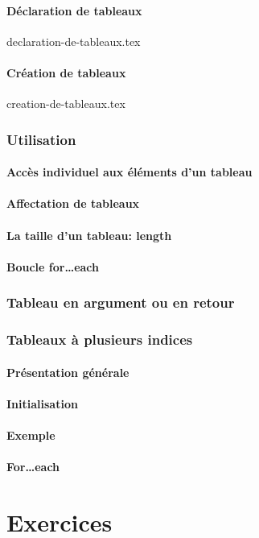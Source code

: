 \documentclass{beamer}
\begin{document}
        \subsection{Déclaration de tableaux}\label{subsec:declaration-de-tableaux}
    {declaration-de-tableaux.tex}
        \subsection{Création de tableaux}\label{subsec:creation-de-tableaux}
    {creation-de-tableaux.tex}

    \section{Utilisation}
        \subsection{Accès individuel aux éléments d'un tableau}\label{subsec:acces-individuel-aux-elements-dun-tableau}
        \subsection{Affectation de tableaux}\label{subsec:affectation-de-tableaux}
        \subsection{La taille d'un tableau: length}\label{subsec:la-taille-dun-tableau}
        \subsection{Boucle for\ldots each}\label{subsec:boucle-foreach}

    \section{Tableau en argument ou en retour}\label{sec:tableau-en-argument-ou-en-retour}

    \section{Tableaux à plusieurs indices}\label{sec:tableaux-a-plusieurs-indices}
        \subsection{Présentation générale}\label{subsec:presentation-generale}
        \subsection{Initialisation}\label{subsec:initialisation}
        \subsection{Exemple}\label{subsec:exemple}
        \subsection{For\ldots each}\label{subsec:for-each}

    \part{Exercices}
\end{document}
